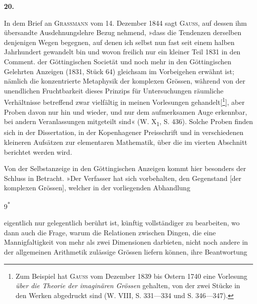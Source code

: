 \clearpage\begingroup{}
\renewcommand{\thefootnote}{\arabic{footnote})}\setcounter{footnote}{0}
\begin{center}
\textbf{20.}\par\smallskip
{}
\end{center}
\noindent\hspace*{\parindent}In dem Brief an \textsc{Grassmann} vom 14. Dezember 1844 sagt \textsc{Gauss}, auf
dessen ihm übersandte Ausdehnungslehre Bezug nehmend, »dass die Tendenzen
derselben  denjenigen Wegen begegnen, auf denen ich selbst nun
fast seit einem halben Jahrhundert gewandelt bin und wovon freilich nur ein
kleiner Teil 1831 in den Comment. der Göttingischen Societät und noch mehr
in den Göttingischen Gelehrten Anzeigen (1831, Stück 64) gleichsam im Vorbeigehen
erwähnt ist; nämlich die konzentrierte Metaphysik der komplexen Grössen,
während von der unendlichen Fruchtbarkeit dieses Prinzips für Untersuchungen
räumliche Verhältnisse betreffend zwar vielfältig in meinen Vorlesungen gehandelt[\footnote{Zum Beispiel hat \textsc{Gauss} vom Dezember 1839 bis Ostern 1740 eine Vorlesung \textit{über die Theorie der imaginären Grössen} gehalten, von der zwei Stücke in den Werken abgedruckt sind (W. VIII, S. 331—334 und S. 346—347).}],
aber Proben davon nur hin und wieder, und  nur dem
aufmerksamen Auge erkennbar, bei andern Veranlassungen mitgeteilt sind«
(W. X\textsubscript{1}, S. 436). Solche Proben finden sich in der Dissertation, in der Kopenhagener
Preisschrift und in verschiedenen kleineren Aufsätzen zur elementaren
Mathematik, über die im vierten Abschnitt berichtet werden wird.
\par
Von der Selbstanzeige in den Göttingischen Anzeigen kommt hier besonders
der Schluss in Betracht. »Der Verfasser hat sich vorbehalten, den
Gegenstand [der komplexen Grössen], welcher in der vorliegenden Abhandlung
\par\smallskip\noindent\hfill{\small 9\textsuperscript{*}}\par
\clearpage{}\setcounter{footnote}{0}
\noindent eigentlich nur gelegentlich berührt ist, künftig vollständiger zu bearbeiten, wo
dann auch die Frage, warum die Relationen zwischen Dingen, die eine Mannigfaltigkeit
von mehr als zwei Dimensionen darbieten, nicht noch andere in
der allgemeinen Arithmetik zulässige Grössen liefern können, ihre Beantwortung
